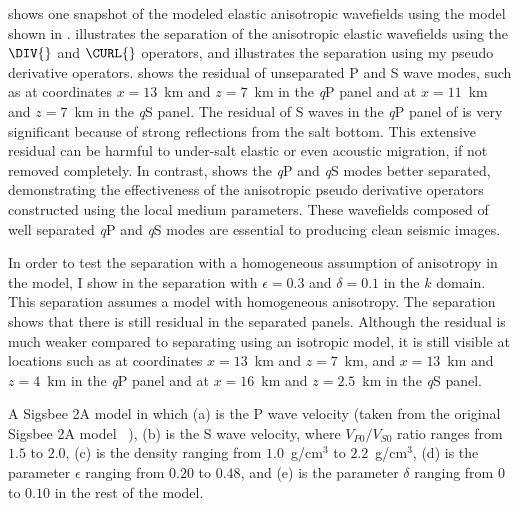  shows one snapshot of the modeled elastic anisotropic 
wavefields using the model shown in . 
 illustrates the separation of the anisotropic elastic
 wavefields using the $\DIV{}$ and $\CURL{}$ operators, and 
 illustrates the separation using my pseudo 
derivative operators.   shows the residual of
unseparated P and S wave modes, such as at coordinates $x=13$~km and
$z=7$~km in the {\it q}P panel and at $x=11$~km and $z=7$~km in the
{\it q}S panel.  The residual of S waves in the {\it q}P panel
of  is very significant because of strong
reflections from the salt bottom.  This extensive residual can be
harmful to under-salt elastic or even acoustic migration, if not
removed completely.  In contrast,  shows the
{\it q}P and {\it q}S modes {better} separated,
demonstrating the effectiveness of the anisotropic pseudo derivative
operators constructed using the local medium parameters.  These
wavefields composed of well separated {\it q}P and {\it q}S modes are
essential to producing clean seismic images.

{In order to test the separation with a homogeneous assumption of 
anisotropy in the model, I show in}  the
separation with $\epsilon=0.3$ and $\delta=0.1$ in the $k$
domain. This separation assumes a model with homogeneous
anisotropy. The separation shows that there is still residual in the
separated panels. Although the residual is much weaker compared to
separating using an isotropic model, it is still visible at locations
such as at coordinates $x=13$~km and $z=7$~km, and $x=13$~km and
$z=4$~km in the {\it q}P panel and at $x=16$~km and $z=2.5$~km in the
{\it q}S panel.

{A Sigsbee 2A model in which (a) is the P wave velocity (taken from
the original Sigsbee 2A model~{\cite[]{SEG-2002-21222125} }), (b) is
the S wave velocity, where $V_{P0}/V_{S0}$ ratio ranges from $1.5$ to $2.0$,
(c) is the density ranging from $1.0$~g/cm$^3$ to $2.2$~g/cm$^3$, (d) is the
parameter $\epsilon$ ranging from $0.20$ to $0.48$, and (e) is the parameter
$\delta$ {ranging} from $0$ to $0.10$ in the rest of the model.  }

